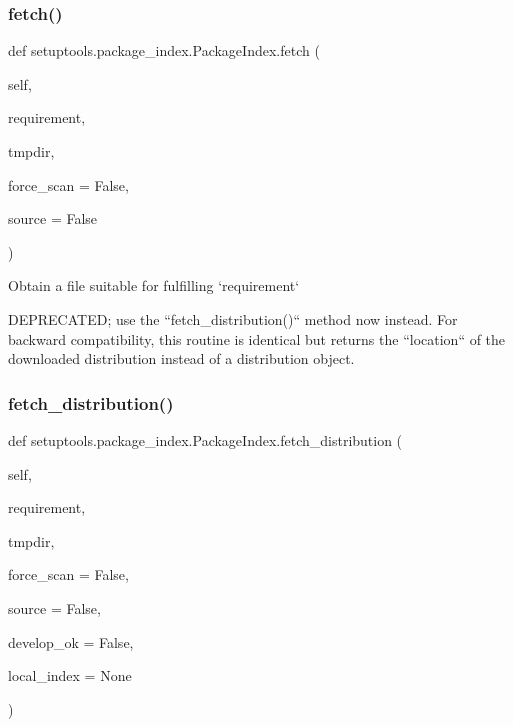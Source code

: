 \subsubsection{\texorpdfstring{fetch()}{fetch()}}
{\footnotesize\ttfamily def setuptools.\+package\+\_\+index.\+Package\+Index.\+fetch (\begin{DoxyParamCaption}\item[{}]{self,  }\item[{}]{requirement,  }\item[{}]{tmpdir,  }\item[{}]{force\+\_\+scan = {\ttfamily False},  }\item[{}]{source = {\ttfamily False} }\end{DoxyParamCaption})}

\begin{DoxyVerb}Obtain a file suitable for fulfilling `requirement`

DEPRECATED; use the ``fetch_distribution()`` method now instead.  For
backward compatibility, this routine is identical but returns the
``location`` of the downloaded distribution instead of a distribution
object.
\end{DoxyVerb}
 \mbox{\label{classsetuptools_1_1package__index_1_1_package_index_a991bcc357db71bc05773ce3bb03c85a4}} 
\subsubsection{\texorpdfstring{fetch\+\_\+distribution()}{fetch\_distribution()}}
{\footnotesize\ttfamily def setuptools.\+package\+\_\+index.\+Package\+Index.\+fetch\+\_\+distribution (\begin{DoxyParamCaption}\item[{}]{self,  }\item[{}]{requirement,  }\item[{}]{tmpdir,  }\item[{}]{force\+\_\+scan = {\ttfamily False},  }\item[{}]{source = {\ttfamily False},  }\item[{}]{develop\+\_\+ok = {\ttfamily False},  }\item[{}]{local\+\_\+index = {\ttfamily None} }\end{DoxyParamCaption})}

